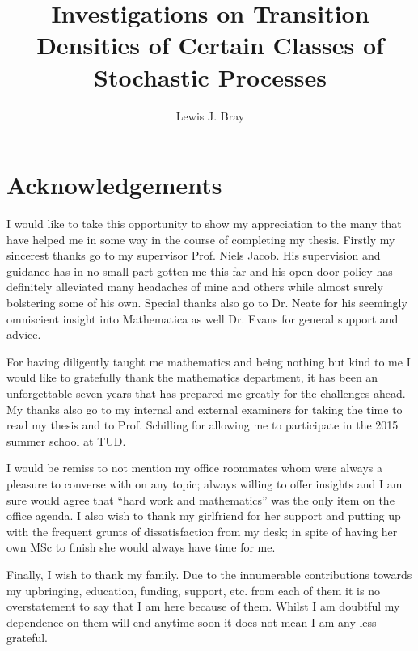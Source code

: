 \documentclass[a4paper, 12pt]{report}
\theoremstyle{remark}
\theoremstyle{definition}
\begin{document}
\title{Investigations on Transition Densities of Certain Classes of Stochastic Processes}
\author{Lewis J. Bray}

\maketitle

\thispagestyle{empty}\null\newpage


\chapter*{Acknowledgements}

I would like to take this opportunity to show my appreciation to the many that have helped me in some way in the course of completing my thesis.  Firstly my sincerest thanks go to my supervisor Prof. Niels Jacob.  His supervision and guidance has in no small part gotten me this far and his open door policy has definitely alleviated many headaches of mine and others while almost surely bolstering some of his own.  Special thanks also go to Dr. Neate for his seemingly omniscient insight into Mathematica as well Dr. Evans for general support and advice.

For having diligently taught me mathematics and being nothing but kind to me I would like to gratefully thank the mathematics department, it has been an unforgettable seven years that has prepared me greatly for the challenges ahead.  My thanks also go to my internal and external examiners for taking the time to read my thesis and to Prof. Schilling for allowing me to participate in the 2015 summer school at TUD.

I would be remiss to not mention my office roommates whom were always a pleasure to converse with on any topic; always willing to offer insights and I am sure would agree that “hard work and mathematics” was the only item on the office agenda.  I also wish to thank my girlfriend for her support and putting up with the frequent grunts of dissatisfaction from my desk; in spite of having her own MSc to finish she would always have time for me.

Finally, I wish to thank my family.  Due to the innumerable contributions towards my upbringing, education, funding, support, etc. from each of them it is no overstatement to say that I am here because of them.  Whilst I am doubtful my dependence on them will end anytime soon it does not mean I am any less grateful.
\end{document}
